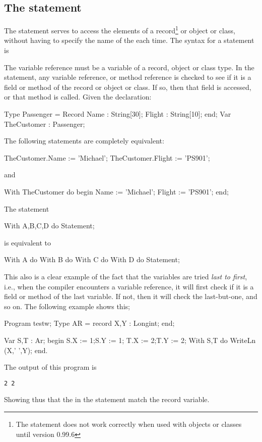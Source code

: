 \documentclass{report}
\begin{document}
\subsection{The  statement}
\label{se:With}
The  statement serves to access the elements of a record\footnote{
The  statement does not work correctly when used with 
objects or classes until version 0.99.6}
or object or class, without having to specify the name of the each time. 
The syntax for a  statement is

The variable reference must be a variable of a record, object or class type.
In the  statement, any variable reference, or method reference is
checked to see if it is a field or method of the record or object or class.
If so, then that field is accessed, or that method is called.
Given the declaration:
\begin{listing}
Type Passenger = Record
       Name : String[30];
       Flight : String[10];
       end;
Var TheCustomer : Passenger;
\end{listing}
The following statements are completely equivalent:
\begin{listing}
TheCustomer.Name := 'Michael';
TheCustomer.Flight := 'PS901';
\end{listing}
and
\begin{listing}
With TheCustomer do
  begin
  Name := 'Michael';
  Flight := 'PS901';
  end;
\end{listing}
The statement
\begin{listing}
With A,B,C,D do Statement;
\end{listing}
is equivalent to
\begin{listing}
With A do
 With B do
  With C do
   With D do Statement;
\end{listing}
This also is a clear example of the fact that the variables are tried {\em last
to first}, i.e., when the compiler encounters a variable reference, it will
first check if it is a field or method of the last variable. If not, then it
will check the last-but-one, and so on.  
The following example shows this;
\begin{listing}
Program testw;
Type AR = record
      X,Y : Longint;
     end;
     
Var S,T : Ar;
begin
  S.X := 1;S.Y := 1;
  T.X := 2;T.Y := 2;
  With S,T do 
    WriteLn (X,' ',Y);
end.     
\end{listing}
The output of this program is
\begin{verbatim}
2 2
\end{verbatim}
Showing thus that the  in the  statement match the 
 record variable.
\end{document}
